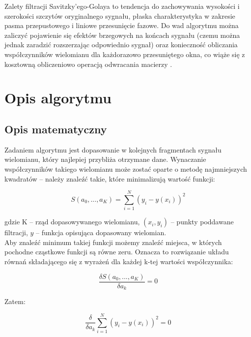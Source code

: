 \documentclass[a4paper]{article}
\begin{document}
Zalety filtracji Savitzky'ego-Golaya to tendencja do zachowywania wysokości i szerokości szczytów oryginalnego sygnału, płaska charakterystyka w zakresie pasma przepustowego i liniowe przesunięcie fazowe. Do wad algorytmu można zaliczyć pojawienie się efektów brzegowych na końcach sygnału (czemu można jednak zaradzić rozszerzając odpowiednio sygnał) oraz konieczność obliczania współczynników wielomianu dla każdorazowo przesuniętego okna, co wiąże się z kosztowną obliczeniowo operacją odwracania macierzy \cite{per-olof}.


\section{Opis algorytmu}

\subsection {Opis matematyczny}

Zadaniem algorytmu jest dopasowanie w kolejnych fragmentach sygnału wielomianu, który najlepiej przybliża otrzymane dane. Wynaczanie współczynników takiego wielomianu może zostać oparte o metodę najmniejszych kwadratów \cite{least-squares} -- należy znaleźć takie, które minimalizują wartość funkcji:

\begin{equation} \label{eq1}
S(a_0, ..., a_K) = \sum_{i=1}^N \left( y_i - y(x_i) \right)^2
\end{equation}

gdzie K -- rząd dopasowywanego wielomianu, $(x_i, y_i)$ -- punkty poddawane filtracji, $y$ -- funkcja opisująca dopasowany wielomian.\\

Aby znaleźć minimum takiej funkcji możemy znaleźć miejsca, w których pochodne cząstkowe funkcji są równe zeru. Oznacza to rozwiązanie układu równań składającego się z wyrażeń dla każdej k-tej wartości współczynnika:

\begin{equation}
\frac{\delta S(a_0, ..., a_K)}{\delta a_k} = 0
\end{equation}

Zatem:

\begin{equation}
\frac{\delta}{\delta a_k} \sum_{i=1}^N \left( y_i - y(x_i) \right)^2 = 0
\end{equation}
\end{document}
